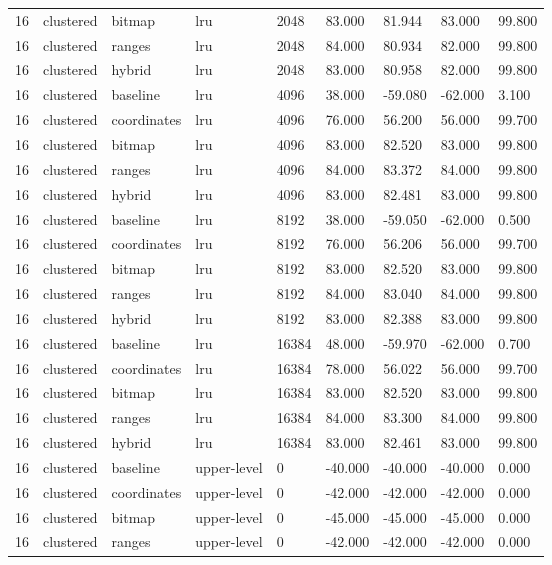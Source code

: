 \begin{tabular}{lllllllll}
16 & clustered & bitmap & lru & 2048 & 83.000 & 81.944 & 83.000 & 99.800 \\
16 & clustered & ranges & lru & 2048 & 84.000 & 80.934 & 82.000 & 99.800 \\
16 & clustered & hybrid & lru & 2048 & 83.000 & 80.958 & 82.000 & 99.800 \\
16 & clustered & baseline & lru & 4096 & 38.000 & -59.080 & -62.000 & 3.100 \\
16 & clustered & coordinates & lru & 4096 & 76.000 & 56.200 & 56.000 & 99.700 \\
16 & clustered & bitmap & lru & 4096 & 83.000 & 82.520 & 83.000 & 99.800 \\
16 & clustered & ranges & lru & 4096 & 84.000 & 83.372 & 84.000 & 99.800 \\
16 & clustered & hybrid & lru & 4096 & 83.000 & 82.481 & 83.000 & 99.800 \\
16 & clustered & baseline & lru & 8192 & 38.000 & -59.050 & -62.000 & 0.500 \\
16 & clustered & coordinates & lru & 8192 & 76.000 & 56.206 & 56.000 & 99.700 \\
16 & clustered & bitmap & lru & 8192 & 83.000 & 82.520 & 83.000 & 99.800 \\
16 & clustered & ranges & lru & 8192 & 84.000 & 83.040 & 84.000 & 99.800 \\
16 & clustered & hybrid & lru & 8192 & 83.000 & 82.388 & 83.000 & 99.800 \\
16 & clustered & baseline & lru & 16384 & 48.000 & -59.970 & -62.000 & 0.700 \\
16 & clustered & coordinates & lru & 16384 & 78.000 & 56.022 & 56.000 & 99.700 \\
16 & clustered & bitmap & lru & 16384 & 83.000 & 82.520 & 83.000 & 99.800 \\
16 & clustered & ranges & lru & 16384 & 84.000 & 83.300 & 84.000 & 99.800 \\
16 & clustered & hybrid & lru & 16384 & 83.000 & 82.461 & 83.000 & 99.800 \\
16 & clustered & baseline & upper-level & 0 & -40.000 & -40.000 & -40.000 & 0.000 \\
16 & clustered & coordinates & upper-level & 0 & -42.000 & -42.000 & -42.000 & 0.000 \\
16 & clustered & bitmap & upper-level & 0 & -45.000 & -45.000 & -45.000 & 0.000 \\
16 & clustered & ranges & upper-level & 0 & -42.000 & -42.000 & -42.000 & 0.000 \\

\end{tabular}
